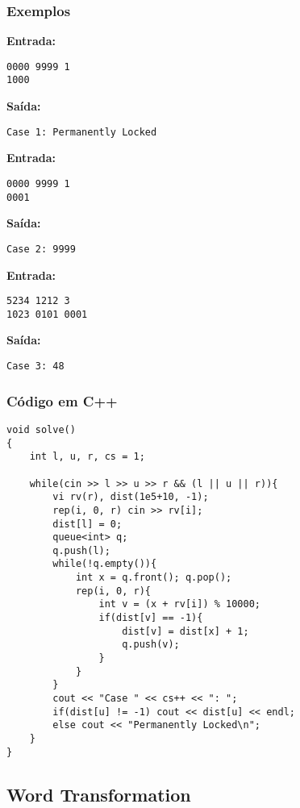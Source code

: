 \subsubsection*{Exemplos}

\textbf{Entrada:}
\begin{verbatim}
0000 9999 1
1000
\end{verbatim}

\textbf{Saída:}
\begin{verbatim}
Case 1: Permanently Locked
\end{verbatim}

\textbf{Entrada:}
\begin{verbatim}
0000 9999 1
0001
\end{verbatim}

\textbf{Saída:}
\begin{verbatim}
Case 2: 9999
\end{verbatim}

\textbf{Entrada:}
\begin{verbatim}
5234 1212 3
1023 0101 0001
\end{verbatim}

\textbf{Saída:}
\begin{verbatim}
Case 3: 48
\end{verbatim}

\subsubsection*{Código em C++}
\begin{lstlisting}
void solve()
{
    int l, u, r, cs = 1;
    
    while(cin >> l >> u >> r && (l || u || r)){
        vi rv(r), dist(1e5+10, -1);
        rep(i, 0, r) cin >> rv[i];
        dist[l] = 0;
        queue<int> q;
        q.push(l);
        while(!q.empty()){
            int x = q.front(); q.pop();
            rep(i, 0, r){
                int v = (x + rv[i]) % 10000;
                if(dist[v] == -1){
                    dist[v] = dist[x] + 1;
                    q.push(v);
                }
            }
        }
        cout << "Case " << cs++ << ": ";
        if(dist[u] != -1) cout << dist[u] << endl;
        else cout << "Permanently Locked\n";
    }
}
\end{lstlisting}

\subsection{Word Transformation}

